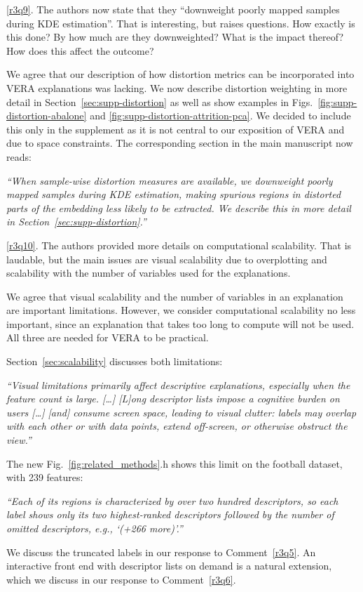 \documentclass[11pt]{article}
\newcounter{rtaskno}
\newcommand{\rtask}[1]{\refstepcounter{rtaskno}\label{#1}}
\newcommand{\reviewc}[2]{\begin{leftbar}\noindent\rtask{#1}\ref{#1}. #2\end{leftbar}\vspace*{-4mm}}
\newcommand{\answer}[1]{\noindent #1\par\vspace{2mm}}
\newcommand{\copyquote}[1]{\vspace{1mm} {\itshape ``#1''}\vspace{1mm}}
\newlength{\leftbarwidth}
\newlength{\leftbarsep}
\renewenvironment{leftbar}{%
    \def\FrameCommand{{\color{black}{\vrule width \leftbarwidth\relax\hspace {\leftbarsep}}}}%
    \MakeFramed {\advance \hsize -\width \FrameRestore }%
}{\endMakeFramed}
\begin{document}
\reviewc{r3q9}{The authors now state that they ``downweight poorly mapped samples during KDE estimation''. That is interesting, but raises questions. How exactly is this done? By how much are they downweighted? What is the impact thereof? How does this affect the outcome?}

\answer{%
We agree that our description of how distortion metrics can be incorporated into VERA explanations was lacking. We now describe distortion weighting in more detail in Section~\ref{sec:supp-distortion} as well as show examples in Figs.~\ref{fig:supp-distortion-abalone} and \ref{fig:supp-distortion-attrition-pca}. We decided to include this only in the supplement as it is not central to our exposition of VERA and due to space constraints. The corresponding section in the main manuscript now reads:

\copyquote{When sample-wise distortion measures are available, we downweight poorly mapped samples during KDE estimation, making spurious regions in distorted parts of the embedding less likely to be extracted. We describe this in more detail in Section~\ref{sec:supp-distortion}.}
}

\reviewc{r3q10}{The authors provided more details on computational scalability. That is laudable, but the main issues are visual scalability due to overplotting and scalability with the number of variables used for the explanations.}

\answer{%
We agree that visual scalability and the number of variables in an explanation are important limitations. However, we consider computational scalability no less important, since an explanation that takes too long to compute will not be used. All three are needed for VERA to be practical.

Section~\ref{sec:scalability} discusses both limitations:

\copyquote{Visual limitations primarily affect descriptive explanations, especially when the feature count is large. [\ldots] [L]ong descriptor lists impose a cognitive burden on users [\ldots] [and] consume screen space, leading to visual clutter: labels may overlap with each other or with data points, extend off-screen, or otherwise obstruct the view.}

The new Fig.~\ref{fig:related_methods}.h shows this limit on the football dataset, with 239 features:

\copyquote{Each of its regions is characterized by over two hundred descriptors, so each label shows only its two highest-ranked descriptors followed by the number of omitted descriptors, e.g., `(+266 more)'.}

We discuss the truncated labels in our response to Comment~\ref{r3q5}. An interactive front end with descriptor lists on demand is a natural extension, which we discuss in our response to Comment~\ref{r3q6}.
}
\end{document}
